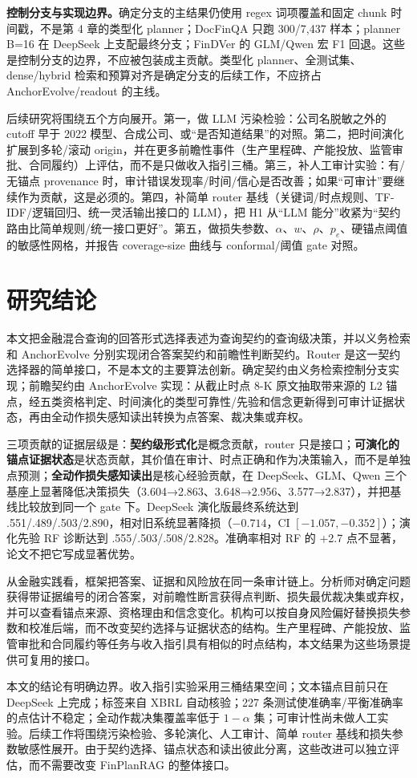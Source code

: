 \begin{revbox}
\noindent\textbf{控制分支与实现边界。}确定分支的主结果仍使用 regex 词项覆盖和固定 chunk 时间戳，不是第 4 章的类型化 planner；DocFinQA 只跑 300/7,437 样本；planner B=16 在 DeepSeek 上支配最终分支；FinDVer 的 GLM/Qwen 宏 F1 回退。这些是控制分支的边界，不应被包装成主贡献。类型化 planner、全测试集、dense/hybrid 检索和预算对齐是确定分支的后续工作，不应挤占 AnchorEvolve/readout 的主线。
\end{revbox}

后续研究将围绕五个方向展开。第一，做 LLM 污染检验：公司名脱敏之外的 cutoff 早于 2022 模型、合成公司、或“是否知道结果”的对照。第二，把时间演化扩展到多轮/滚动 origin，并在更多前瞻性事件（生产里程碑、产能投放、监管审批、合同履约）上评估，而不是只做收入指引三桶。第三，补人工审计实验：有/无锚点 provenance 时，审计错误发现率/时间/信心是否改善；如果“可审计”要继续作为贡献，这是必须的。第四，补简单 router 基线（关键词/时点规则、TF-IDF/逻辑回归、统一灵活输出接口的 LLM），把 H1 从“LLM 能分”收紧为“契约路由比简单规则/统一接口更好”。第五，做损失参数、$\alpha$、$w$、$\rho$、$p_e$、硬锚点阈值的敏感性网格，并报告 coverage-size 曲线与 conformal/阈值 gate 对照。

\section{研究结论}

本文把金融混合查询的回答形式选择表述为查询契约的查询级决策，并以义务检索和 AnchorEvolve 分别实现闭合答案契约和前瞻性判断契约。Router 是这一契约选择器的简单接口，不是本文的主要算法创新。确定契约由义务检索控制分支实现；前瞻契约由 AnchorEvolve 实现：从截止时点 8-K 原文抽取带来源的 L2 锚点，经五类资格判定、时间演化的类型可靠性/先验和信念更新得到可审计证据状态，再由全动作损失感知读出转换为点答案、裁决集或弃权。

\begin{revbox}
\noindent 三项贡献的证据层级是：\textbf{契约级形式化}是概念贡献，router 只是接口；\textbf{可演化的锚点证据状态}是状态贡献，其价值在审计、时点正确和作为决策输入，而不是单独点预测；\textbf{全动作损失感知读出}是核心经验贡献，在 DeepSeek、GLM、Qwen 三个基座上显著降低决策损失（3.604→2.863、3.648→2.956、3.577→2.837），并把基线比较放到同一个 gate 下。DeepSeek 演化版最终系统达到 .551/.489/.503/2.890，相对旧系统显著降损（$-0.714$，CI $[-1.057,-0.352]$）；演化先验 RF 诊断达到 .555/.503/.508/2.828。准确率相对 RF 的 +2.7 点不显著，论文不把它写成显著优势。
\end{revbox}

从金融实践看，框架把答案、证据和风险放在同一条审计链上。分析师对确定问题获得带证据编号的闭合答案，对前瞻性断言获得点判断、损失最优裁决集或弃权，并可以查看锚点来源、资格理由和信念变化。机构可以按自身风险偏好替换损失参数和校准后端，而不改变契约选择与证据状态的结构。生产里程碑、产能投放、监管审批和合同履约等任务与收入指引具有相似的时点结构，本文结果为这些场景提供可复用的接口。

本文的结论有明确边界。收入指引实验采用三桶结果空间；文本锚点目前只在 DeepSeek 上完成；标签来自 XBRL 自动核验；227 条测试使准确率/平衡准确率的点估计不稳定；全动作裁决集覆盖率低于 $1-\alpha$ 集；可审计性尚未做人工实验。后续工作将围绕污染检验、多轮演化、人工审计、简单 router 基线和损失参数敏感性展开。由于契约选择、锚点状态和读出彼此分离，这些改进可以独立评估，而不需要改变 FinPlanRAG 的整体接口。
